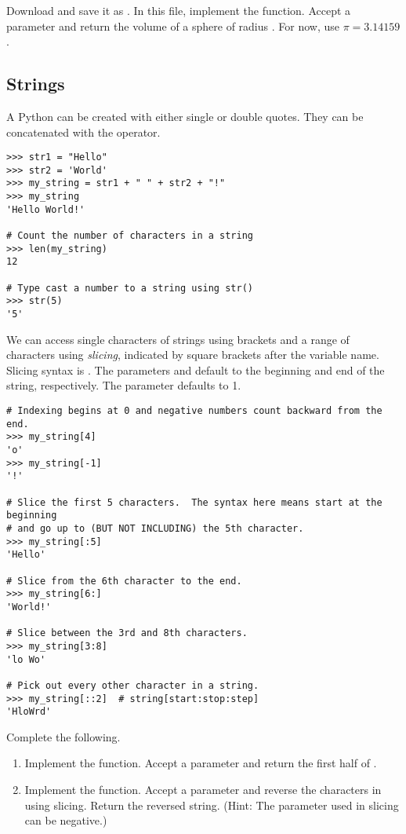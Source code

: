 \begin{problem}
Download  and save it as .
In this file, implement the  function.
Accept a parameter  and return the volume of a sphere of radius .
For now, use $\pi=3.14159$.
\end{problem}


\subsection*{Strings}
A Python  can be created with either single or double quotes.
They can be concatenated with the \li{+} operator.
\begin{lstlisting}
>>> str1 = "Hello"
>>> str2 = 'World'
>>> my_string = str1 + " " + str2 + "!"
>>> my_string
'Hello World!'

# Count the number of characters in a string
>>> len(my_string)
12

# Type cast a number to a string using str()
>>> str(5)
'5'
\end{lstlisting}

We can access single characters of strings using brackets and a range of characters using \emph{slicing}, indicated by square brackets \li{[ ]} after the variable name.
Slicing syntax is .
The parameters  and  default to the beginning and end of the string, respectively.
The parameter  defaults to 1.

\begin{lstlisting}
# Indexing begins at 0 and negative numbers count backward from the end.
>>> my_string[4]
'o'
>>> my_string[-1]
'!'

# Slice the first 5 characters.  The syntax here means start at the beginning
# and go up to (BUT NOT INCLUDING) the 5th character.
>>> my_string[:5]
'Hello'

# Slice from the 6th character to the end.
>>> my_string[6:]
'World!'

# Slice between the 3rd and 8th characters.
>>> my_string[3:8]
'lo Wo'

# Pick out every other character in a string.
>>> my_string[::2]	# string[start:stop:step]
'HloWrd'
\end{lstlisting}

\begin{problem}
Complete the following.
\begin{enumerate}
\item Implement the  function. Accept a parameter  and return the first half of .
\item Implement the  function. Accept a parameter  and reverse the characters in  using slicing.
Return the reversed string.
(Hint: The  parameter used in slicing can be negative.)
\end{enumerate}
\end{problem}

